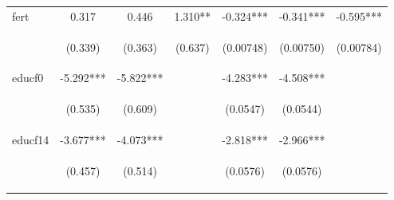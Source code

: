\documentclass{article}[11pt,subeqn]
\begin{document}
\begin{spacing}{1.25}
\begin{sidewaystable}[!htbp]
\begin{center}
\begin{tabular}{lcccccc}
fert	&	0.317	&	0.446	&	1.310**	&	-0.324***	&	-0.341***	&	-0.595***	\\
\vspace{4pt}	&	 \begin{footnotesize}(0.339) \end{footnotesize}	&	 \begin{footnotesize}(0.363) \end{footnotesize}	&	 \begin{footnotesize}(0.637) \end{footnotesize}	&	 \begin{footnotesize}(0.00748) \end{footnotesize}	&	 \begin{footnotesize}(0.00750) \end{footnotesize}	&	 \begin{footnotesize}(0.00784) \end{footnotesize}	\\
educf0	&	-5.292***	&	-5.822***	&		&	-4.283***	&	-4.508***	&		\\
\vspace{4pt}	&	 \begin{footnotesize}(0.535) \end{footnotesize}	&	 \begin{footnotesize}(0.609) \end{footnotesize}	&	\begin{footnotesize}\end{footnotesize}	&	 \begin{footnotesize}(0.0547) \end{footnotesize}	&	 \begin{footnotesize}(0.0544) \end{footnotesize}	&	\begin{footnotesize}\end{footnotesize}	\\
educf14	&	-3.677***	&	-4.073***	&		&	-2.818***	&	-2.966***	&		\\
\vspace{4pt}	&	 \begin{footnotesize}(0.457) \end{footnotesize}	&	 \begin{footnotesize}(0.514) \end{footnotesize}	&	\begin{footnotesize}\end{footnotesize}	&	 \begin{footnotesize}(0.0576) \end{footnotesize}	&	 \begin{footnotesize}(0.0576) \end{footnotesize}	&	\begin{footnotesize}\end{footnotesize}	\\

\end{tabular}
\end{center}
\end{sidewaystable}
\end{spacing}
\end{document}
